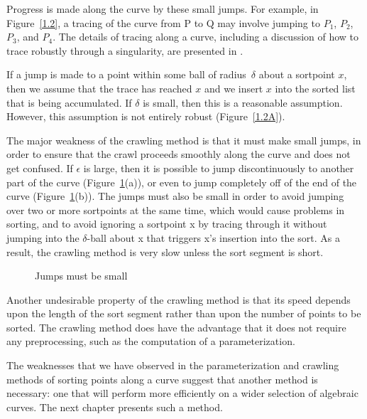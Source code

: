 %
%

Progress is made along the curve by these small jumps.
For example, in Figure~\ref{1.2}, a tracing of the curve from P to Q 
may involve jumping to $P_{1}$, $P_{2}$, $P_{3}$, and $P_{4}$.
The details of tracing along a curve, including a discussion of how to trace
robustly through a singularity, are presented in \cite{bhh}.
%
%


If a jump is made to a point within some ball of radius~$\delta$ about a
sortpoint $x$, then we assume that the trace has reached $x$ and we insert
$x$ into the sorted list that is being accumulated.
If $\delta$ is small, then this is a reasonable assumption.
However, this assumption is not entirely robust (Figure~\ref{1.2A}).
%
%

The major weakness of the crawling method is that it must make small jumps, 
in order to ensure that the crawl proceeds smoothly along the curve and does 
not get confused.
If $\epsilon$ is large, then it is possible to jump discontinuously to 
another part of the curve (Figure~\ref{1.3}(a)), 
or even to jump completely off of the end of the curve (Figure~\ref{1.3}(b)).
The jumps must also be small in order to avoid jumping over two or more 
sortpoints at the same time, which would cause problems in sorting,
and to avoid ignoring a sortpoint x by tracing through it without jumping into
the $\delta$-ball about x that triggers x's insertion into the sort.
As a result, the crawling method is 
very slow unless the sort segment is short.

%
\begin{figure}[htbp]\vspace{2.25in}\caption{Jumps must be small}\label{1.3}\end{figure}
%

Another undesirable property of the crawling method 
is that its speed depends upon the length of
the sort segment rather than upon the number of points to be sorted.
The crawling method does have the advantage that it does not require any
preprocessing, such as the computation of a parameterization.

The weaknesses that we have observed in the 
parameterization and crawling methods of sorting points along a curve
suggest that another method is necessary: one that will perform more
efficiently on a wider selection of algebraic curves.
The next chapter presents such a method.
